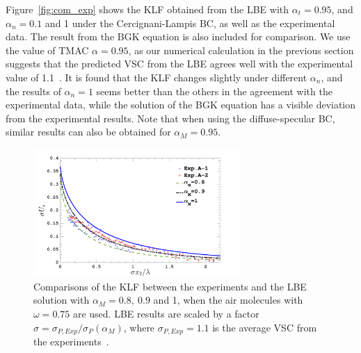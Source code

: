 
Figure~\ref{fig:com_exp} shows the KLF obtained from the LBE with $\alpha_t=0.95$, and $\alpha_n=0.1$ and 1 under the Cercignani-Lampis BC, as well as the experimental data. The result from the BGK equation is also included for comparison. We use the value of TMAC $\alpha=0.95$, as our numerical calculation in the previous section suggests that the predicted VSC from the LBE agrees well with the experimental value of 1.1~\cite{reynolds1974velocity}. It is found that the KLF changes slightly under different $\alpha_n$, and the results of $\alpha_n=1$ seems better than the others in the agreement with the experimental data, while the solution of the BGK equation has a visible deviation from the experimental results. Note that when using the diffuse-specular BC, similar results can also be obtained for $\alpha_M=0.95$.



\begin{figure}[t]\label{com_air}
	\begin{centering}
		\includegraphics[width=0.7\textwidth]{SlipJump/IMG/rescale_KLF_new}
		\par\end{centering}
	\caption{ Comparisons of the KLF between the experiments and the LBE solution with $\alpha_M=0.8,~0.9$ and 1, when the air molecules with $\omega=0.75$ are used. LBE results are scaled by a factor $\sigma=\sigma_{P,Exp}/\sigma_P(\alpha_M)$, where $\sigma_{P,Exp}=1.1$ is the average VSC from the experiments~\cite{reynolds1974velocity}. }
	\label{fig:com_exp_air}
\end{figure}


